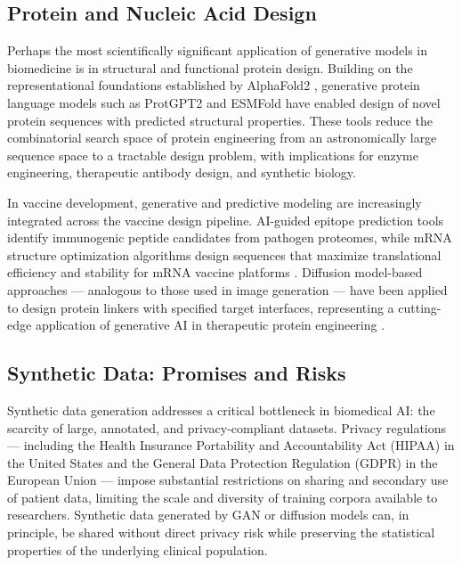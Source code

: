 \subsection{Protein and Nucleic Acid Design}

Perhaps the most scientifically significant application of generative models in biomedicine is in structural and functional protein design. Building on the representational foundations established by AlphaFold2 \parencite{jumper2021}, generative protein language models such as ProtGPT2 \parencite{ferruz2022} and ESMFold \parencite{lin2023} have enabled design of novel protein sequences with predicted structural properties. These tools reduce the combinatorial search space of protein engineering from an astronomically large sequence space to a tractable design problem, with implications for enzyme engineering, therapeutic antibody design, and synthetic biology.

In vaccine development, generative and predictive modeling are increasingly integrated across the vaccine design pipeline. AI-guided epitope prediction tools identify immunogenic peptide candidates from pathogen proteomes, while mRNA structure optimization algorithms design sequences that maximize translational efficiency and stability for mRNA vaccine platforms \parencite{imani2025}. Diffusion model-based approaches --- analogous to those used in image generation --- have been applied to design protein linkers with specified target interfaces, representing a cutting-edge application of generative AI in therapeutic protein engineering \parencite{watson2023}.

\subsection{Synthetic Data: Promises and Risks}

Synthetic data generation addresses a critical bottleneck in biomedical AI: the scarcity of large, annotated, and privacy-compliant datasets. Privacy regulations --- including the Health Insurance Portability and Accountability Act (HIPAA) in the United States and the General Data Protection Regulation (GDPR) in the European Union --- impose substantial restrictions on sharing and secondary use of patient data, limiting the scale and diversity of training corpora available to researchers. Synthetic data generated by GAN or diffusion models can, in principle, be shared without direct privacy risk while preserving the statistical properties of the underlying clinical population.


